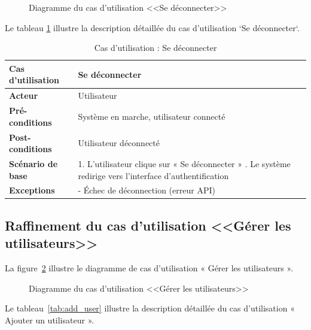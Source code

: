 \begin{figure}[h]
     \centering
     \caption{Diagramme du cas d'utilisation <<Se déconnecter>>}
     \label{fig:logout_diagram}
\end{figure}
Le tableau \ref{tab:rafLogout} illustre la description détaillée du cas d'utilisation `Se déconnecter`.
\begin{table}[!h]
\centering
\caption{Cas d’utilisation : Se déconnecter}
\renewcommand{\arraystretch}{1.2}
\begin{tabular}{|p{4.2cm}|p{11cm}|}
\hline
\textbf{Cas d'utilisation} & Se déconnecter \\
\hline
\textbf{Acteur} & Utilisateur \\
\hline
\textbf{Pré-conditions} & Système en marche, utilisateur connecté \\
\hline
\textbf{Post-conditions} & Utilisateur déconnecté \\
\hline
\textbf{Scénario de base} & 
1. L’utilisateur clique sur « Se déconnecter » \newline
2. Le système redirige vers l’interface d’authentification \\
\hline
\textbf{Exceptions} & 
- Échec de déconnection (erreur API) \\
\hline
\end{tabular}
\label{tab:rafLogout}
\end{table}
\subsection{Raffinement du cas d'utilisation <<Gérer les utilisateurs>>}
La figure~\ref{fig:manage_users_diagram} illustre le diagramme de cas d'utilisation « Gérer les utilisateurs ».

\begin{figure}[h]
     \centering
     \caption{Diagramme du cas d'utilisation <<Gérer les utilisateurs>>}
     \label{fig:manage_users_diagram}
\end{figure}
\newpage
Le tableau~\ref{tab:add_user} illustre la description détaillée du cas d'utilisation « Ajouter un utilisateur ».

